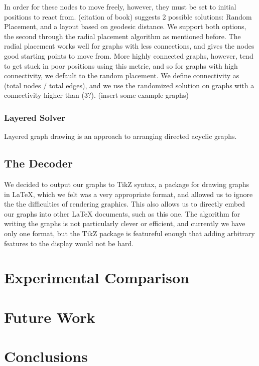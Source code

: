 \documentclass{article}
\begin{document}
In order for these nodes to move freely, however, they must be set to initial positions to react from. (citation of book) suggests 2 possible solutions: 
Random Placement, and a layout based on geodesic distance. We support both options, the second through the radial placement algorithm as mentioned before.
The radial placement works well for graphs with less connections, and gives the nodes good starting points to move from. More highly connected graphs,
however, tend to get stuck in poor positions using this metric, and so for graphs with high connectivity, we default to the random placement. We define 
connectivity as (total nodes / total edges), and we use the randomized solution on graphs with a connectivity higher than (3?).
(insert some example graphs)

\subsubsection{Layered Solver}
Layered graph drawing is an approach to arranging directed acyclic graphs.


\subsection{The Decoder}
We decided to output our graphs to TikZ syntax, a package for drawing graphs in LaTeX, which we felt was a very appropriate format, and allowed us to ignore the 
the difficulties of rendering graphics. This also allows us to directly embed our graphs into other LaTeX documents, such as this one. The algorithm for 
writing the graphs is not particularly clever or efficient, and currently we have only one format, but the TikZ package is featureful enough that adding arbitrary
features to the display would not be hard.


\section{Experimental Comparison}


\section{Future Work}


\section{Conclusions}



\end{document}
